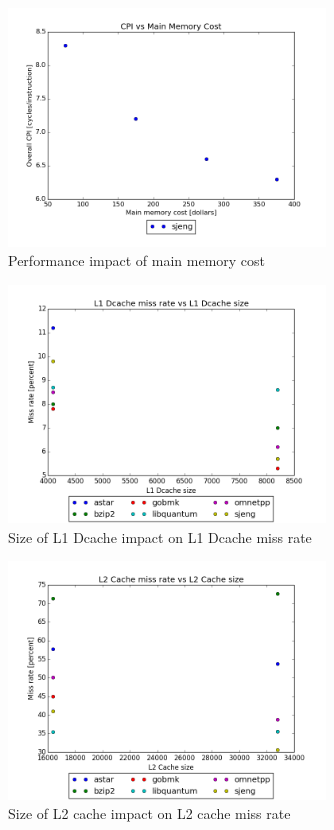 \documentclass{article}
\begin{document}
\begin{figure}[ht]
    \centering
    \includegraphics[width=0.75\textwidth]{plots/CPI_vs_Main_Mem_Cost.png}
    \caption{Performance impact of main memory cost}
    \label{fig:cpivsmainmemcost}
\end{figure}

\begin{figure}[ht]
    \centering
    \includegraphics[width=0.75\textwidth]{plots/L1_Dcache_miss_vs_L1_Dcache_size.png}
    \caption{Size of L1 Dcache impact on L1 Dcache miss rate}
    \label{fig:l1vsmiss}
\end{figure}

\begin{figure}[ht]
    \centering
    \includegraphics[width=0.75\textwidth]{plots/L2cache_miss_vs_size.png}
    \caption{Size of L2 cache impact on L2 cache miss rate}
    \label{fig:l2vsmiss}
\end{figure}
\end{document}
